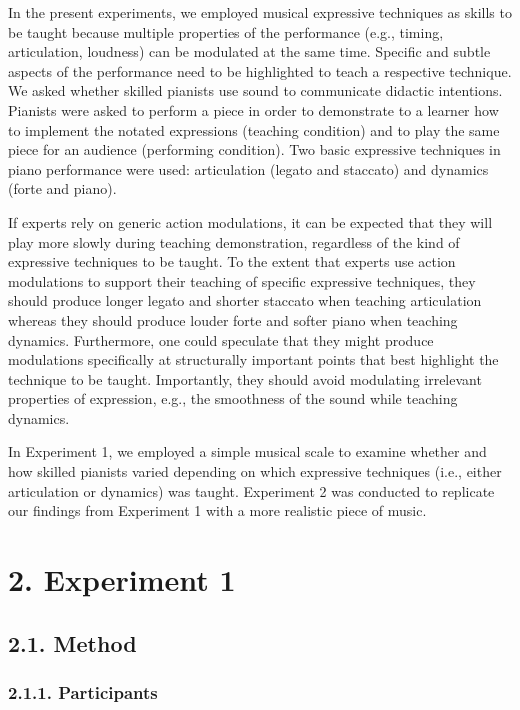 \documentclass[
  english,
  man,floatsintext]{apa6}
\begin{document}
In the present experiments, we employed musical expressive techniques as skills to be taught because multiple properties of the performance (e.g., timing, articulation, loudness) can be modulated at the same time. Specific and subtle aspects of the performance need to be highlighted to teach a respective technique. We asked whether skilled pianists use sound to communicate didactic intentions. Pianists were asked to perform a piece in order to demonstrate to a learner how to implement the notated expressions (teaching condition) and to play the same piece for an audience (performing condition). Two basic expressive techniques in piano performance were used: articulation (legato and staccato) and dynamics (forte and piano).

If experts rely on generic action modulations, it can be expected that they will play more slowly during teaching demonstration, regardless of the kind of expressive techniques to be taught. To the extent that experts use action modulations to support their teaching of specific expressive techniques, they should produce longer legato and shorter staccato when teaching articulation whereas they should produce louder forte and softer piano when teaching dynamics. Furthermore, one could speculate that they might produce modulations specifically at structurally important points that best highlight the technique to be taught. Importantly, they should avoid modulating irrelevant properties of expression, e.g., the smoothness of the sound while teaching dynamics.

In Experiment 1, we employed a simple musical scale to examine whether and how skilled pianists varied depending on which expressive techniques (i.e., either articulation or dynamics) was taught. Experiment 2 was conducted to replicate our findings from Experiment 1 with a more realistic piece of music.

\clearpage

\hypertarget{experiment-1}{%
\section{2. Experiment 1}\label{experiment-1}}

\hypertarget{method}{%
\subsection{2.1. Method}\label{method}}

\hypertarget{participants}{%
\subsubsection{2.1.1. Participants}\label{participants}}
\end{document}
